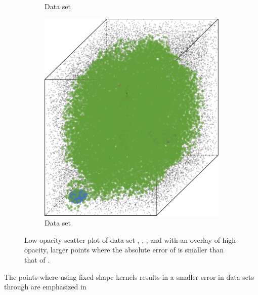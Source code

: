 \begin{figure}
\begin{subfigure}{0.23\textwidth}
				\caption{Data set \ferdosiThree}
				\label{fig:discussion:performance:mbeLowerError:ferdosi3}
			\end{subfigure}
			\begin{subfigure}{0.23\textwidth}
				\centering
				\includegraphics[keepaspectratio=true, width=\textwidth, height=0.23\textheight]{discussion/img/baakman_3_abs_error_mbeSmallerThansambe}
				\caption{Data set \baakmanThree}
				\label{fig:discussion:performance:mbeLowerError:baakman3}
			\end{subfigure}			
			\caption{Low opacity scatter plot of data set %
				 \ferdosiTwo, %
				 \baakmanTwo, %
				 \ferdosiThree, and %
				 \baakmanThree %
				with an overlay of high opacity, larger points where the absolute error of \mbe is smaller than that of \sambe.}
			\label{fig:discussion:performance:multisphere:mbeLowerError}
		\end{figure}	
		The points where using fixed-shape kernels results in a smaller error in data sets \ferdosiTwo through \baakmanThree are emphasized in
